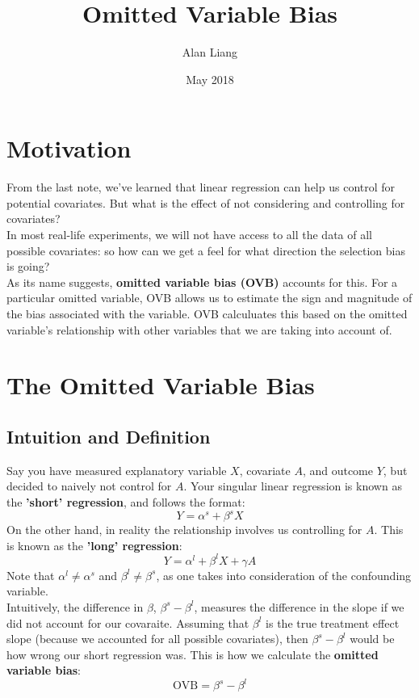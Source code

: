 \documentclass{article}
\title{Omitted Variable Bias}
\author{Alan Liang}
\date{May 2018}
\begin{document}
\maketitle
\section{Motivation}
From the last note, we've learned that linear regression can help us control for potential covariates.
But what is the effect of not considering and controlling for covariates?
\\
In most real-life experiments, we will not have access to all the data of all possible covariates: so how can we get a feel for what direction the selection bias is going?
\\
As its name suggests, \textbf{omitted variable bias (OVB)} accounts for this. 
For a particular omitted variable, OVB allows us to estimate the sign and magnitude of the bias associated with the variable.
OVB calculuates this based on the omitted variable's relationship with other variables that we are taking into account of. 

\section{The Omitted Variable Bias}
\subsection{Intuition and Definition}
Say you have measured explanatory variable $X$, covariate $A$, and outcome $Y$, but decided to naively not control for $A$. 
Your singular linear regression is known as the \textbf{'short' regression}, and follows the format:
$$Y = \alpha^s + \beta^s X$$
On the other hand, in reality the relationship involves us controlling for $A$.
This is known as the \textbf{'long' regression}:
$$Y = \alpha^l + \beta^l X + \gamma A$$ 
Note that $\alpha^l \neq \alpha^s$ and $\beta^l \neq \beta^s$, as one takes into consideration of the confounding variable.
\\
Intuitively, the difference in $\beta$, $\beta^s - \beta^l$, measures the difference in the slope if we did not account for our covaraite. 
Assuming that $\beta^l$ is the true treatment effect slope (because we accounted for all possible covariates), then $\beta^s - \beta^l$ would be how wrong our short regression was.
This is how we calculate the \textbf{omitted variable bias}:
$$\text{OVB} = \beta^s - \beta^l$$
\end{document}
